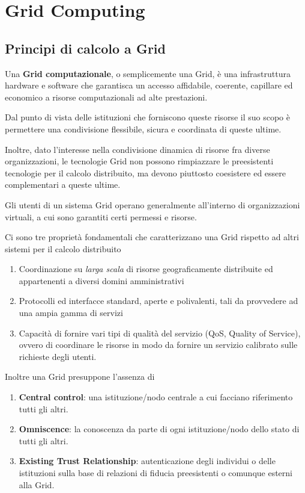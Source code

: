 \documentclass[italian,]{article}
\providecommand{\tightlist}{%
  \setlength{\itemsep}{0pt}\setlength{\parskip}{0pt}}
\begin{document}
\section{Grid Computing}\label{grid-computing}

\subsection{Principi di calcolo a
Grid}\label{principi-di-calcolo-a-grid}

Una \textbf{Grid computazionale}, o semplicemente una Grid, è una
infrastruttura hardware e software che garantisca un accesso affidabile,
coerente, capillare ed economico a risorse computazionali ad alte
prestazioni.

Dal punto di vista delle istituzioni che forniscono queste risorse il
suo scopo è permettere una condivisione flessibile, sicura e coordinata
di queste ultime.

Inoltre, dato l'interesse nella condivisione dinamica di risorse fra
diverse organizzazioni, le tecnologie Grid non possono rimpiazzare le
preesistenti tecnologie per il calcolo distribuito, ma devono piuttosto
coesistere ed essere complementari a queste ultime.

Gli utenti di un sistema Grid operano generalmente all'interno di
organizzazioni virtuali, a cui sono garantiti certi permessi e risorse.

Ci sono tre proprietà fondamentali che caratterizzano una Grid rispetto
ad altri sistemi per il calcolo distribuito

\begin{enumerate}
\def\labelenumi{\arabic{enumi}.}
\tightlist
\item
  Coordinazione su \emph{larga scala} di risorse geograficamente
  distribuite ed appartenenti a diversi domini amministrativi
\item
  Protocolli ed interfacce standard, aperte e polivalenti, tali da
  provvedere ad una ampia gamma di servizi
\item
  Capacità di fornire vari tipi di qualità del servizio (QoS, Quality of
  Service), ovvero di coordinare le risorse in modo da fornire un
  servizio calibrato sulle richieste degli utenti.
\end{enumerate}

Inoltre una Grid presuppone l'assenza di

\begin{enumerate}
\def\labelenumi{\arabic{enumi}.}
\tightlist
\item
  \textbf{Central control}: una istituzione/nodo centrale a cui facciano
  riferimento tutti gli altri.
\item
  \textbf{Omniscence}: la conoscenza da parte di ogni istituzione/nodo
  dello stato di tutti gli altri.
\item
  \textbf{Existing Trust Relationship}: autenticazione degli individui o
  delle istituzioni sulla base di relazioni di fiducia preesistenti o
  comunque esterni alla Grid.
\end{enumerate}
\end{document}
